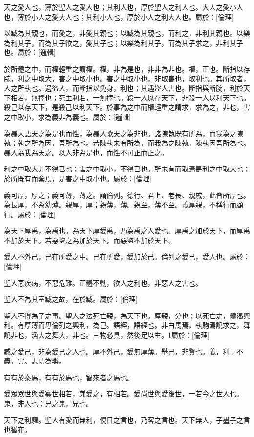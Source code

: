 
\begin{pinyinscope}
天之愛人也，薄於聖人之愛人也；其利人也，厚於聖人之利人也。大人之愛小人也，薄於小人之愛大人也；其利小人也，厚於小人之利大人也。屬於：[倫理]

以臧為其親也，而愛之，非愛其親也；以臧為其親也，而利之，非利其親也。以樂為利其子，而為其子欲之，愛其子也；以樂為利其子，而為其子求之，非利其子也。屬於：[邏輯]

於所體之中，而權輕重之謂權。權，非為是也，非非為非也。權，正也。斷指以存腕，利之中取大，害之中取小也。害之中取小也，非取害也，取利也。其所取者，人之所執也。遇盜人，而斷指以免身，利也；其遇盜人害也。斷指與斷腕，利於天下相若，無擇也；死生利若，一無擇也。殺一人以存天下，非殺一人以利天下也。殺己以存天下，是殺己以利天下。於事為之中而權輕重之謂求，求為之，非也，害之中取小，求為義非為義也。屬於：[邏輯]

為暴人語天之為是也而性，為暴人歌天之為非也。諸陳執既有所為，而我為之陳執；執之所為因，吾所為也。若陳執未有所為，而我為之陳執，陳執因吾所為也。暴人為我為天之。以人非為是也，而性不可正而正之。

利之中取大非不得已也；害之中取小，不得已也。所未有而取焉是利之中取大也；於所既有而棄焉，是害之中取小也。屬於：[倫理]

義可厚，厚之；義可薄，薄之。謂倫列。德行、君上、老長、親戚，此皆所厚也。為長厚，不為幼薄。親厚，厚；親薄，薄。親至，薄不至。義厚親，不稱行而顧行。屬於：[倫理]

為天下厚禹，為禹也。為天下厚愛禹，乃為禹之人愛也。厚禹之加於天下，而厚禹不加於天下。若惡盜之為加於天下，而惡盜不加於天下。

愛人不外己，己在所愛之中。己在所愛，愛加於己。倫列之愛己，愛人也。屬於：[倫理]

聖人惡疾病，不惡危難。正體不動，欲人之利也，非惡人之害也。

聖人不為其室臧之故，在於臧。屬於：[倫理]

聖人不得為子之事。聖人之法死亡親，為天下也。厚親，分也；以死亡之，體渴興利。有厚薄而毋倫列之興利，為己。語經，語經也。非白馬焉。執駒焉說求之，舞說非也，漁大之舞大，非也。三物必具，然後足以生。1屬於：[倫理]

臧之愛己，非為愛己之人也。厚不外己，愛無厚薄。舉己，非賢也。義，利；不義，害。志功為辯。

有有於秦馬，有有於馬也，智來者之馬也。

愛眾眾世與愛寡世相若，兼愛之，有相若。愛尚世與愛後世，一若今之世人也。鬼，非人也；兄之鬼，兄也。

天下之利驩。聖人有愛而無利，俔日之言也，乃客之言也。天下無人，子墨子之言也猶在。


\end{pinyinscope}
